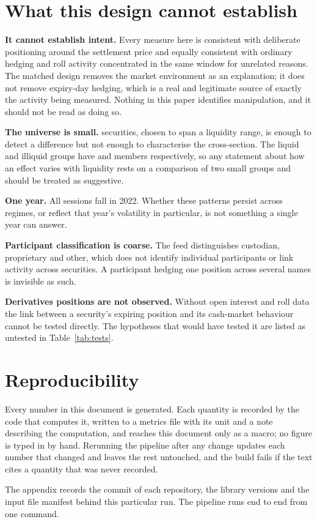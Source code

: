 \documentclass[11pt,a4paper]{article}
\begin{document}
\section{What this design cannot establish}\label{sec:limits}

\textbf{It cannot establish intent.} Every measure here is consistent with deliberate
positioning around the settlement price and equally consistent with ordinary hedging and
roll activity concentrated in the same window for unrelated reasons. The matched design
removes the market environment as an explanation; it does not remove expiry-day hedging,
which is a real and legitimate source of exactly the activity being measured. Nothing in
this paper identifies manipulation, and it should not be read as doing so.

\textbf{The universe is small.} \DesignSymbols{} securities, chosen to span a liquidity
range, is enough to detect a difference but not enough to characterise the cross-section.
The liquid and illiquid groups have \DesignLiquidSymbols{} and \DesignIlliquidSymbols{}
members respectively, so any statement about how an effect varies with liquidity rests on a
comparison of two small groups and should be treated as suggestive.

\textbf{One year.} All \DesignSessions{} sessions fall in 2022. Whether these patterns
persist across regimes, or reflect that year's volatility in particular, is not something a
single year can answer.

\textbf{Participant classification is coarse.} The feed distinguishes custodian,
proprietary and other, which does not identify individual participants or link activity
across securities. A participant hedging one position across several names is invisible as
such.

\textbf{Derivatives positions are not observed.} Without open interest and roll data the
link between a security's expiring position and its cash-market behaviour cannot be tested
directly. The hypotheses that would have tested it are listed as untested in
Table~\ref{tab:tests}.


\section{Reproducibility}

Every number in this document is generated. Each quantity is recorded by the code that
computes it, written to a metrics file with its unit and a note describing the computation,
and reaches this document only as a macro; no figure is typed in by hand. Rerunning the
pipeline after any change updates each number that changed and leaves the rest untouched,
and the build fails if the text cites a quantity that was never recorded.

The appendix records the commit of each repository, the library versions and the input file
manifest behind this particular run. The pipeline runs end to end from one command.



\end{document}
